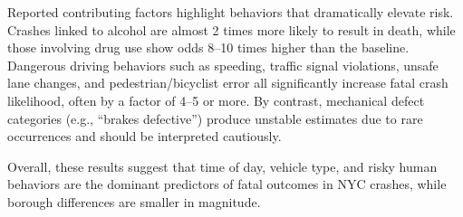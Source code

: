 \documentclass[10pt]{article}\usepackage[]{graphicx}\usepackage[]{xcolor}
\begin{document}
Reported contributing factors highlight behaviors that dramatically elevate risk. Crashes linked to alcohol are almost 2 times more likely to result in death, while those involving drug use show odds 8–10 times higher than the baseline. Dangerous driving behaviors such as speeding, traffic signal violations, unsafe lane changes, and pedestrian/bicyclist error all significantly increase fatal crash likelihood, often by a factor of 4–5 or more. By contrast, mechanical defect categories (e.g., “brakes defective”) produce unstable estimates due to rare occurrences and should be interpreted cautiously.

Overall, these results suggest that time of day, vehicle type, and risky human behaviors are the dominant predictors of fatal outcomes in NYC crashes, while borough differences are smaller in magnitude.
\end{document}
